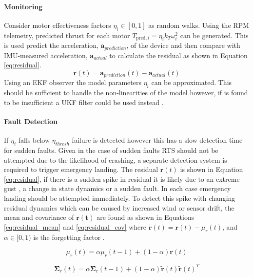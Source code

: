 \paragraph{Monitoring}
Consider motor effectiveness factors $\eta_i \in [0,1]$ as random walks. Using the \gls{RPM} telemetry, predicted thrust for each motor $T_{\text{pred},i} = \eta_i k_T \omega_i^2$ can be generated. This is used predict the acceleration, $\mathbf{a}_{prediction}$, of the device and then compare with IMU-measured acceleration,  $\mathbf{a}_{actual}$ to calculate the residual as shown in Equation \ref{eq:residual}. 
\begin{equation}\label{eq:residual}
    \mathbf{r}(t) = \mathbf{a}_{prediction}(t) - \mathbf{a}_{actual}(t)
\end{equation}
Using an \gls{EKF} observer the model parameters $\eta_i$ can be approximated. This should be sufficient to handle the non-linearities of the model however, if is found to be insufficient a \gls{UKF} filter could be used instead \cite{WAN2000}.
\paragraph{Fault Detection}
If $\eta_i$ falls below $\eta_{thresh}$ failure is detected however this has a slow detection time for sudden faults. Given in the case of sudden faults \gls{RTS} should not be attempted due to the likelihood of crashing, a separate detection system is required to trigger emergency landing. The residual $\mathbf{r}(t)$ is shown in Equation \ref{eq:residual}, if there is a sudden spike in residual it is likely due to an extreme gust , a change in state dynamics or a sudden fault. In each case emergency landing should be attempted immediately. To detect this spike with changing residual dynamics which can be caused by increased wind or sensor drift, the mean and covariance of $\mathbf{r(t)}$ are found as shown in Equations \ref{eq:residual_mean} and \ref{eq:residual_cov} where  $\mathbf{\tilde{r}}(t) = \mathbf{r}(t) - \mu_r(t)$, and $\alpha \in [0,1)$ is the forgetting factor \cite{roberts1959}.

\begin{equation}\label{eq:residual_mean}
     \mu_r(t) = \alpha \mu_r(t-1) + (1 - \alpha) \mathbf{r}(t)
\end{equation}

\begin{equation}\label{eq:residual_cov}
    \mathbf{\Sigma}_r(t) = \alpha \mathbf{\Sigma}_r(t-1) + (1 - \alpha) \mathbf{\tilde{r}}(t)\mathbf{\tilde{r}}(t)^T
\end{equation}

